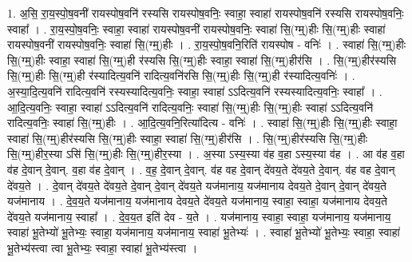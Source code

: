 \documentclass[17pt]{extarticle}
\begin{document}
1. अ॒सि॒ रा॒य॒स्पो॒ष॒वनी॑ रायस्पोष॒वनि॑ रस्यसि रायस्पोष॒वनिः॒ स्वाहा॒ स्वाहा॑ रायस्पोष॒वनि॑ रस्यसि रायस्पोष॒वनिः॒ स्वाहा᳚ । . रा॒य॒स्पो॒ष॒वनिः॒ स्वाहा॒ स्वाहा॑ रायस्पोष॒वनी॑ रायस्पोष॒वनिः॒ स्वाहा॑ सि॒(ग्म्॒)हीः सि॒(ग्म्॒)हीः स्वाहा॑ रायस्पोष॒वनी॑ रायस्पोष॒वनिः॒ स्वाहा॑ सि॒(ग्म्॒)हीः । . रा॒य॒स्पो॒ष॒वनि॒रिति॑ रायस्पोष - वनिः॑ । . स्वाहा॑ सि॒(ग्म्॒)हीः सि॒(ग्म्॒)हीः स्वाहा॒ स्वाहा॑ सि॒(ग्म्॒)ही र॑स्यसि सि॒(ग्म्॒)हीः स्वाहा॒ स्वाहा॑ सि॒(ग्म्॒)हीर॑सि । . सि॒(ग्म्॒)हीर॑स्यसि सि॒(ग्म्॒)हीः सि॒(ग्म्॒)ही र॑स्यादित्य॒वनि॑ रादित्य॒वनि॑रसि सि॒(ग्म्॒)हीः सि॒(ग्म्॒)ही र॑स्यादित्य॒वनिः॑ । . अ॒स्या॒दि॒त्य॒वनि॑ रादित्य॒वनि॑ रस्यस्यादित्य॒वनिः॒ स्वाहा॒ स्वाहा॑ ऽऽदित्य॒वनि॑ रस्यस्यादित्य॒वनिः॒ स्वाहा᳚ । . आ॒दि॒त्य॒वनिः॒ स्वाहा॒ स्वाहा॑ ऽऽदित्य॒वनि॑ रादित्य॒वनिः॒ स्वाहा॑ सि॒(ग्म्॒)हीः सि॒(ग्म्॒)हीः स्वाहा॑ ऽऽदित्य॒वनि॑ रादित्य॒वनिः॒ स्वाहा॑ सि॒(ग्म्॒)हीः । . आ॒दि॒त्य॒वनि॒रित्या॑दित्य - वनिः॑ । . स्वाहा॑ सि॒(ग्म्॒)हीः सि॒(ग्म्॒)हीः स्वाहा॒ स्वाहा॑ सि॒(ग्म्॒)हीर॑स्यसि सि॒(ग्म्॒)हीः स्वाहा॒ स्वाहा॑ सि॒(ग्म्॒)हीर॑सि । . सि॒(ग्म्॒)हीर॑स्यसि सि॒(ग्म्॒)हीः सि॒(ग्म्॒)हीर॒स्या ऽसि॑ सि॒(ग्म्॒)हीः सि॒(ग्म्॒)हीर॒स्या । . अ॒स्या ऽस्य॒स्या व॑ह व॒हा ऽस्य॒स्या व॑ह । . आ व॑ह व॒हा व॑ह दे॒वान् दे॒वान्. व॒हा व॑ह दे॒वान् । . व॒ह॒ दे॒वान् दे॒वान्. व॑ह वह दे॒वान् दे॑वय॒ते दे॑वय॒ते दे॒वान्. व॑ह वह दे॒वान् दे॑वय॒ते । . दे॒वान् दे॑वय॒ते दे॑वय॒ते दे॒वान् दे॒वान् दे॑वय॒ते यज॑मानाय॒ यज॑मानाय देवय॒ते दे॒वान् दे॒वान् दे॑वय॒ते यज॑मानाय । . दे॒व॒य॒ते यज॑मानाय॒ यज॑मानाय देवय॒ते दे॑वय॒ते यज॑मानाय॒ स्वाहा॒ स्वाहा॒ यज॑मानाय देवय॒ते दे॑वय॒ते यज॑मानाय॒ स्वाहा᳚ । . दे॒व॒य॒त इति॑ देव - य॒ते । . यज॑मानाय॒ स्वाहा॒ स्वाहा॒ यज॑मानाय॒ यज॑मानाय॒ स्वाहा॑ भू॒तेभ्यो॑ भू॒तेभ्यः॒ स्वाहा॒ यज॑मानाय॒ यज॑मानाय॒ स्वाहा॑ भू॒तेभ्यः॑ । . स्वाहा॑ भू॒तेभ्यो॑ भू॒तेभ्यः॒ स्वाहा॒ स्वाहा॑ भू॒तेभ्य॑स्त्वा त्वा भू॒तेभ्यः॒ स्वाहा॒ स्वाहा॑ भू॒तेभ्य॑स्त्वा । \newline
\end{document}
